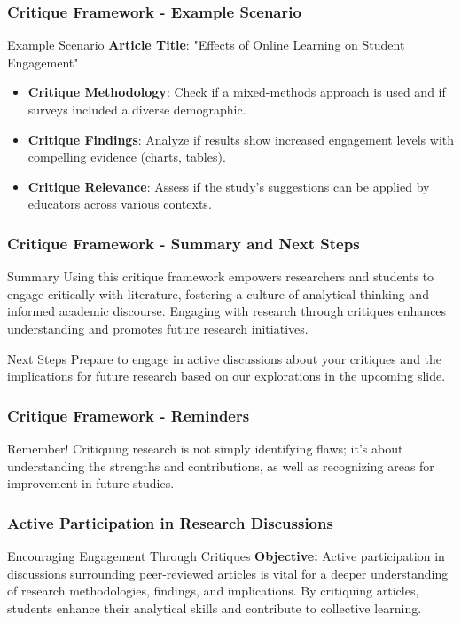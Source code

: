 \documentclass[aspectratio=169]{beamer}
\begin{document}
\begin{frame}[fragile]
    \frametitle{Critique Framework - Example Scenario}
    \begin{block}{Example Scenario}
        \textbf{Article Title}: "Effects of Online Learning on Student Engagement"
    \end{block}
    \begin{itemize}
        \item \textbf{Critique Methodology}: Check if a mixed-methods approach is used and if surveys included a diverse demographic.
        \item \textbf{Critique Findings}: Analyze if results show increased engagement levels with compelling evidence (charts, tables).
        \item \textbf{Critique Relevance}: Assess if the study's suggestions can be applied by educators across various contexts.
    \end{itemize}
\end{frame}

\begin{frame}[fragile]
    \frametitle{Critique Framework - Summary and Next Steps}
    \begin{block}{Summary}
        Using this critique framework empowers researchers and students to engage critically with literature, fostering a culture of analytical thinking and informed academic discourse. Engaging with research through critiques enhances understanding and promotes future research initiatives.
    \end{block}
    \begin{block}{Next Steps}
        Prepare to engage in active discussions about your critiques and the implications for future research based on our explorations in the upcoming slide.
    \end{block}
\end{frame}

\begin{frame}[fragile]
    \frametitle{Critique Framework - Reminders}
    \begin{block}{Remember!}
        Critiquing research is not simply identifying flaws; it’s about understanding the strengths and contributions, as well as recognizing areas for improvement in future studies.
    \end{block}
\end{frame}

\begin{frame}[fragile]
    \frametitle{Active Participation in Research Discussions}
    \begin{block}{Encouraging Engagement Through Critiques}
        \textbf{Objective:} Active participation in discussions surrounding peer-reviewed articles is vital for a deeper understanding of research methodologies, findings, and implications. By critiquing articles, students enhance their analytical skills and contribute to collective learning.
    \end{block}
\end{frame}
\end{document}
